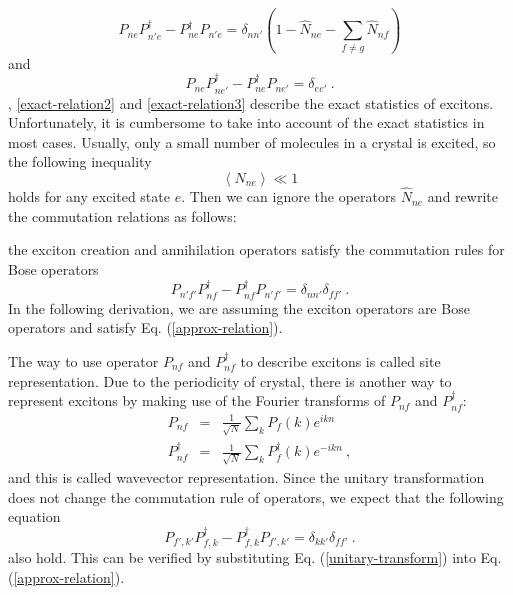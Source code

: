 \begin{equation}
P_{ne}P_{n'e}^{\dagger}-P_{ne}^{\dagger}P_{n'e}  =  \delta_{nn'}\left(1-\hat{N}_{ne}-\sum_{f\neq g}\hat{N}_{nf}\right)  \label{exact-relation2}
\end{equation}
and 
\begin{equation}
P_{ne}P_{ne'}^{\dagger}-P_{ne}^{\dagger}P_{ne'}=\delta_{ee'}\ .  \label{exact-relation3}
\end{equation}
, \autoref{exact-relation2} and \autoref{exact-relation3} describe the exact
statistics of excitons.  Unfortunately, it is cumbersome to take into account of the exact
statistics in most cases. Usually, only a small number of molecules in a crystal is excited, so the following inequality
\begin{equation}
\left\langle N_{ne} \right\rangle \ll 1 \label{condition-for-Bose-approx}
\end{equation}
holds for any excited state $e$. Then we can ignore the operators $\hat{N}_{ne}$ and rewrite the commutation 
relations as follows:


 the exciton creation and annihilation operators satisfy the commutation rules for Bose operators
\begin{equation}
P_{n'f'}P_{nf}^{\dagger} - P_{nf}^{\dagger}P_{n'f'}=\delta_{nn'}\delta_{ff'} \ . \label{approx-relation}
\end{equation}
In the following derivation, we are assuming the exciton operators are Bose operators and satisfy Eq. (\ref{approx-relation}). 

The way to use operator $P_{nf}$ and $P_{nf}^{\dagger}$ to describe excitons is called site representation. Due to the periodicity of crystal, there is another way to represent excitons by making use of the Fourier transforms of $P_{nf}$ and $P_{nf}^{\dagger}$: 
\begin{eqnarray}
P_{nf} &=& \frac{1}{\sqrt{N}} \sum_{k} P_{f}(k) e^{ikn} \nonumber \\
P_{nf}^{\dagger} &=& \frac{1}{\sqrt{N}} \sum_{k} P_{f}^{\dagger}(k) e^{-ikn} \ , \label{unitary-transform}
\end{eqnarray}
and this is called wavevector representation. Since the unitary transformation does not change the commutation rule of operators, we expect that the following equation
\begin{equation}
P_{f',k'}P_{f,k}^{\dagger} - P_{f,k}^{\dagger}P_{f',k'}=\delta_{kk'}\delta_{ff'} \ . \label{approx-relation-in-wavevector}
\end{equation}
also hold. This can be verified by substituting Eq. (\ref{unitary-transform}) into Eq. (\ref{approx-relation}). 





